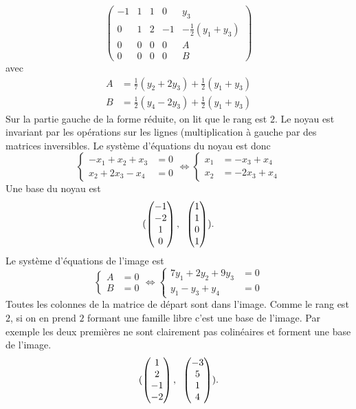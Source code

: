 \[
\begin{pmatrix}
    -1 & 1  & 1 & 0  & y_3 \\
    0  & 1  & 2 & -1 & -\frac{1}{2}( y_1 + y_3)\\
    0  & 0  & 0 & 0  & A\\
    0  & 0  & 0 & 0  & B
\end{pmatrix}
\]
avec
\[
  \begin{aligned}
    A &= \frac{1}{7}(y_2 + 2y_3) + \frac{1}{2}( y_1 + y_3) \\
    B &= \frac{1}{2}( y_4 - 2y_3) + \frac{1}{2}( y_1 + y_3)
  \end{aligned}
\]
Sur la partie gauche de la forme réduite, on lit que le rang est $2$. Le noyau est invariant par les opérations sur les lignes (multiplication à gauche par des matrices inversibles.
Le système d'équations du noyau est donc
\[
\left\lbrace
\begin{aligned}
  -x_1 + x_2 + x_3 &= 0 \\
        x_2+ 2x_3 - x_4 &=0
\end{aligned}
\right.
\Leftrightarrow 
\left\lbrace
\begin{aligned}
  x_1 &= -x_3 + x_4 \\
  x_2 &= -2x_3 + x_4 
\end{aligned}
\right.
\]
Une base du noyau est
\[
  (
  \begin{pmatrix}
    -1 \\ -2 \\ 1 \\ 0
  \end{pmatrix}, \hspace{0.2cm}
  \begin{pmatrix}
    1 \\ 1 \\ 0 \\ 1
  \end{pmatrix}
  ).
\]
Le système d'équations de l'image est
\[
  \left\lbrace
  \begin{aligned}
    A &= 0 \\ B &= 0
  \end{aligned}
  \right.
  \Leftrightarrow
  \left\lbrace
  \begin{aligned}
    7y_1 +2 y_2 + 9y_3 &= 0 \\ y_1 - y_3 +y_4 &= 0
  \end{aligned}
  \right.  
\]
Toutes les colonnes de la matrice de départ sont dans l'image. Comme le rang est $2$, si on en prend $2$ formant une famille libre c'est une base de l'image. Par exemple les deux premières ne sont clairement pas colinéaires et forment une base de l'image.
\[
  (
  \begin{pmatrix}
    1 \\ 2 \\ -1 \\ -2
  \end{pmatrix}, \hspace{0.2cm}
  \begin{pmatrix}
    -3 \\ 5 \\ 1 \\ 4
  \end{pmatrix}
  ).
\]
